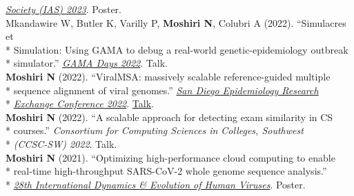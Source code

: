 \documentclass[margin,line]{res}
\begin{document}
\begin{resume}
\hspace*{9.5mm}\href{https://www.iasociety.org/conferences/ias2023}{\textit{Society (IAS) 2023}}. Poster.\\
\hspace*{4mm} Mkandawire W, Butler K, Varilly P, \textbf{Moshiri N}, Colubri A (2022). ``Simulacres et\\*
\hspace*{9.5mm} Simulation: Using GAMA to debug a real-world genetic-epidemiology outbreak\\*\vspace{2mm}
\hspace*{8mm} simulator.'' \href{https://gama-platform.org/Gama-Days-2022/}{\textit{GAMA Days 2022}}. Talk.\\
\hspace*{4mm} \textbf{Moshiri N} (2022). ``ViralMSA: massively scalable reference-guided multiple\\*
\hspace*{9.5mm} sequence alignment of viral genomes.'' \href{https://publichealth.sdsu.edu/epiexchange}{\textit{San Diego Epidemiology Research}}\\*\vspace{2mm}
\hspace*{8mm} \href{https://publichealth.sdsu.edu/epiexchange}{\textit{Exchange Conference 2022}}. \href{https://docs.google.com/document/d/e/2PACX-1vTufgGn-94tzBuzs1MXideQPxZApXW0EvSHIyfKQX8xdXPvwVo1H3C4WbWSgmp67BbERnjzc_tkYqdm/pub}{Talk}.\\
\hspace*{4mm} \textbf{Moshiri N} (2022). ``A scalable approach for detecting exam similarity in CS\\*
\hspace*{9.5mm} courses.'' \textit{Consortium for Computing Sciences in Colleges, Southwest}\\*\vspace{2mm}
\hspace*{8mm} \textit{(CCSC-SW) 2022}. Talk.\\
\hspace*{4mm} \textbf{Moshiri N} (2021). ``Optimizing high-performance cloud computing to enable\\*
\hspace*{9.5mm} real-time high-throughput SARS-CoV-2 whole genome sequence analysis.''\\*\vspace{2mm}
\hspace*{8mm} \href{https://cpd.ucsd.edu/hivdynamics/}{\textit{28th International Dynamics \& Evolution of Human Viruses}}. Poster.\\

\end{resume}
\end{document}
